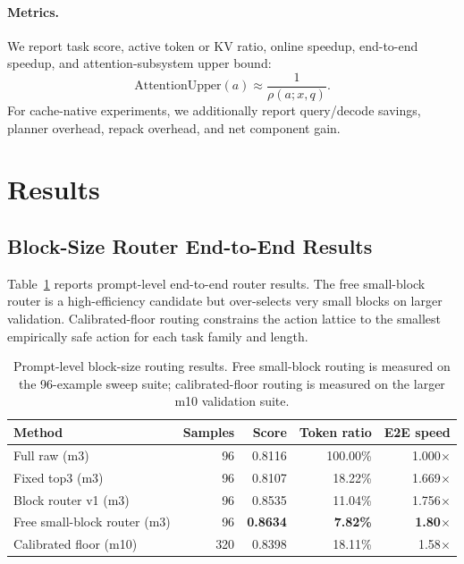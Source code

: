 \documentclass{article}
\begin{document}
\paragraph{Metrics.}
We report task score, active token or KV ratio, online speedup, end-to-end speedup, and attention-subsystem upper bound:
\begin{equation}
    \mathrm{AttentionUpper}(a) \approx \frac{1}{\rho(a;x,q)}.
\end{equation}
For cache-native experiments, we additionally report query/decode savings, planner overhead, repack overhead, and net component gain.

\section{Results}

\subsection{Block-Size Router End-to-End Results}

Table~\ref{tab:router-e2e} reports prompt-level end-to-end router results.
The free small-block router is a high-efficiency candidate but over-selects very small blocks on larger validation.
Calibrated-floor routing constrains the action lattice to the smallest empirically safe action for each task family and length.

\begin{table}[t]
\centering
\caption{Prompt-level block-size routing results. Free small-block routing is measured on the 96-example sweep suite; calibrated-floor routing is measured on the larger m10 validation suite.}
\label{tab:router-e2e}
\begin{tabular}{lrrrr}
\toprule
Method & Samples & Score & Token ratio & E2E speed \\
\midrule
Full raw (m3) & 96 & 0.8116 & 100.00\% & 1.000$\times$ \\
Fixed top3 (m3) & 96 & 0.8107 & 18.22\% & 1.669$\times$ \\
Block router v1 (m3) & 96 & 0.8535 & 11.04\% & 1.756$\times$ \\
Free small-block router (m3) & 96 & \textbf{0.8634} & \textbf{7.82\%} & \textbf{1.80}$\times$ \\
Calibrated floor (m10) & 320 & 0.8398 & 18.11\% & 1.58$\times$ \\
\bottomrule
\end{tabular}
\end{table}
\end{document}
